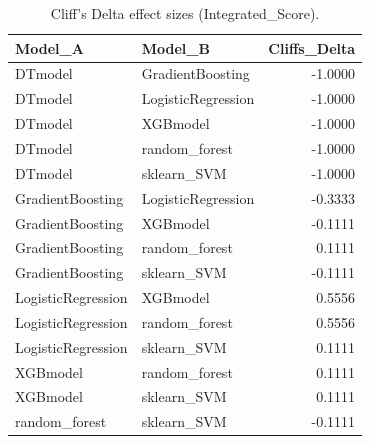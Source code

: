 \begin{table}[t]
\centering
\begin{tabular}{llr}
\toprule
Model_A & Model_B & Cliffs_Delta \\
\midrule
DTmodel & GradientBoosting & -1.0000 \\
DTmodel & LogisticRegression & -1.0000 \\
DTmodel & XGBmodel & -1.0000 \\
DTmodel & random_forest & -1.0000 \\
DTmodel & sklearn_SVM & -1.0000 \\
GradientBoosting & LogisticRegression & -0.3333 \\
GradientBoosting & XGBmodel & -0.1111 \\
GradientBoosting & random_forest & 0.1111 \\
GradientBoosting & sklearn_SVM & -0.1111 \\
LogisticRegression & XGBmodel & 0.5556 \\
LogisticRegression & random_forest & 0.5556 \\
LogisticRegression & sklearn_SVM & 0.1111 \\
XGBmodel & random_forest & 0.1111 \\
XGBmodel & sklearn_SVM & 0.1111 \\
random_forest & sklearn_SVM & -0.1111 \\
\bottomrule
\end{tabular}
\caption{Cliff's Delta effect sizes (Integrated_Score).}
\label{tab:cliffs_Integrated_Score}
\end{table}